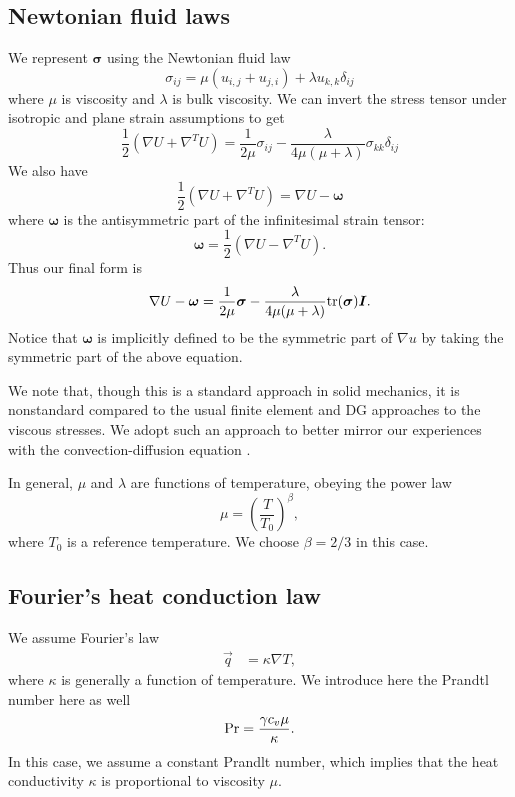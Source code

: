 \documentclass{article}
\newcommand{\grad}{\nabla}
\begin{document}
\subsection{Newtonian fluid laws}
We represent $\boldsymbol\sigma$ using the Newtonian fluid law
\[
\sigma_{ij} = \mu(u_{i,j} + u_{j,i}) + \lambda u_{k,k} \delta_{ij}
\]
where $\mu$ is viscosity and $\lambda$ is bulk viscosity. 
We can invert the stress tensor under isotropic and plane strain assumptions to get
\[
\frac{1}{2}\left(\grad  U + \grad ^T  U\right) = \frac{1}{2\mu} \sigma_{ij} - \frac{\lambda}{4\mu (\mu + \lambda)} \sigma_{kk}\delta_{ij}
\]
We also have
\[
\frac{1}{2}\left(\grad  U + \grad ^T  U\right) = \grad  U - \boldsymbol \omega
\]
where $\boldsymbol \omega$ is the antisymmetric part of the infinitesimal strain tensor:
\[
\boldsymbol \omega = \frac{1}{2}\left(\grad  U - \grad ^T  U\right).
\]
Thus our final form is
\begin{align*}
\grad  U - \boldsymbol \omega = \frac{1}{2\mu} \boldsymbol \sigma - \frac{\lambda}{4\mu (\mu + \lambda)} { \rm tr}(\boldsymbol \sigma) \boldsymbol I.
\end{align*}
Notice that $\boldsymbol \omega$ is implicitly defined to be the symmetric part of $\grad u$ by taking the symmetric part of the above equation. 

We note that, though this is a standard approach in solid mechanics, it is nonstandard compared to the usual finite element and DG approaches to the viscous stresses. We adopt such an approach to better mirror our experiences with the convection-diffusion equation \cite{DPGrobustness,DPGrobustness2}. 

In general, $\mu$ and $\lambda$ are functions of temperature, obeying the power law
\[
\mu = \left(\frac{T}{T_0}\right)^\beta,
\]
where $T_0$ is a reference temperature. We choose $\beta = 2/3$ in this case. 

\subsection{Fourier's heat conduction law}
We assume Fourier's law 
\begin{align*}
\vec{q} &= \kappa \grad T,
\end{align*}
where $\kappa$ is generally a function of temperature. We introduce here the Prandtl number here as well
\[
{\rm Pr} = \frac{\gamma c_v \mu}{\kappa}.
\]
In this case, we assume a constant Prandlt number, which implies that the heat conductivity $\kappa$ is proportional to viscosity $\mu$.
\end{document}
